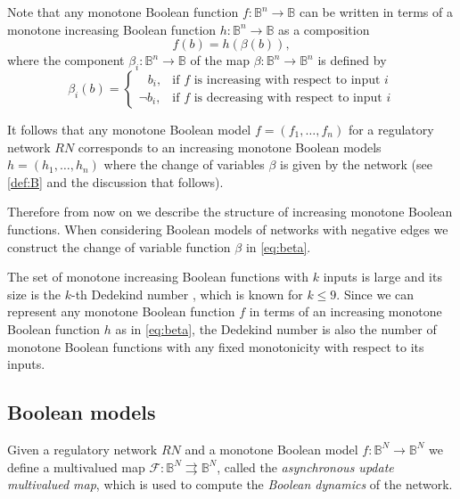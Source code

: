 \documentclass[12pt, notitlepage]{amsart}
\newcommand{\cF}{{\mathcal F}}
\theoremstyle{definition}
\newcommand{\bbB}{\mathbb{B}}
\begin{document}
  Note that any monotone Boolean function $f \colon \bbB^n \to \bbB$ can be written in terms of a monotone increasing Boolean function
  $h \colon \bbB^n \to \bbB$ as a composition
  \begin{equation}
    \label{eq:beta}
    f(b) = h(\beta(b)),
  \end{equation}
  where the component $\beta_i \colon \bbB^n \to \bbB$ of the map $\beta \colon \bbB^n \to \bbB^n$ is defined by
  \[
    \beta_i(b) =
    \begin{cases}
      \;\;\, b_i, & \text{if } f \text{ is increasing with respect to input } i \\
      \neg b_i,   & \text{if } f \text{ is decreasing with respect to input } i
    \end{cases}
  \]

  It follows that any monotone Boolean model $f = (f_1, \ldots, f_n)$ for a regulatory network $RN$ corresponds to an increasing  monotone Boolean models $h = (h_1, \ldots, h_n)$ where the change of variables $\beta$ is given by the network (see \eqref{def:B} and the discussion that follows).

  Therefore from now on we describe the structure of increasing monotone Boolean functions. When considering Boolean models of networks with negative edges we construct the change of variable function $\beta$ in \eqref{eq:beta}.

  The set of monotone increasing Boolean functions with $k$ inputs is large and its size is the $k$-th Dedekind number \cite{Kleitman1969}, which is known for $k \leq 9$. Since we can represent any monotone Boolean function $f$ in terms of an increasing monotone Boolean function $h$ as in \eqref{eq:beta}, the Dedekind number is also the number of monotone Boolean functions with any fixed monotonicity with respect to its inputs.

  \subsection{Boolean models}

  Given a regulatory network $RN$ and a monotone Boolean model $f \colon \bbB^N \to \bbB^N$ we define a multivalued map $\cF \colon \bbB^N \rightrightarrows \bbB^N$, called the \textit{asynchronous update multivalued map}, which is used to compute the \emph{Boolean dynamics} of the network.
\end{document}
